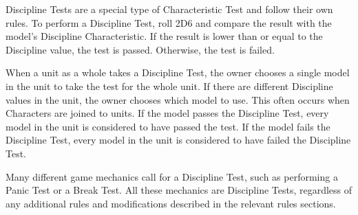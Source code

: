 Discipline Tests are a special type of Characteristic Test and follow their own rules. To perform a Discipline Test, roll 2D6 and compare the result with the model's Discipline Characteristic. If the result is lower than or equal to the Discipline value, the test is passed. Otherwise, the test is failed.

When a unit as a whole takes a Discipline Test, the owner chooses a single model in the unit to take the test for the whole unit. If there are different Discipline values in the unit, the owner chooses which model to use. This often occurs when Characters are joined to units. If the model passes the Discipline Test, every model in the unit is considered to have passed the test. If the model fails the Discipline Test, every model in the unit is considered to have failed the Discipline Test.

Many different game mechanics call for a Discipline Test, such as performing a Panic Test or a Break Test. All these mechanics are Discipline Tests, regardless of any additional rules and modifications described in the relevant rules sections.

\RBemc

